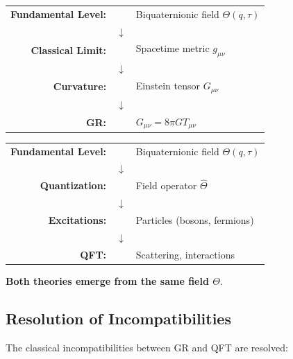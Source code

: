 \documentclass[12pt]{article}
\begin{document}
\begin{center}
\begin{tabular}{rcl}
\textbf{Fundamental Level:} & & Biquaternionic field $\Theta(q,\tau)$ \\
& $\downarrow$ & \\
\textbf{Classical Limit:} & & Spacetime metric $g_{\mu\nu}$ \\
& $\downarrow$ & \\
\textbf{Curvature:} & & Einstein tensor $G_{\mu\nu}$ \\
& $\downarrow$ & \\
\textbf{GR:} & & $G_{\mu\nu} = 8\pi G T_{\mu\nu}$ \\
\end{tabular}
\qquad\qquad
\begin{tabular}{rcl}
\textbf{Fundamental Level:} & & Biquaternionic field $\Theta(q,\tau)$ \\
& $\downarrow$ & \\
\textbf{Quantization:} & & Field operator $\hat{\Theta}$ \\
& $\downarrow$ & \\
\textbf{Excitations:} & & Particles (bosons, fermions) \\
& $\downarrow$ & \\
\textbf{QFT:} & & Scattering, interactions \\
\end{tabular}
\end{center}

\textbf{Both theories emerge from the same field $\Theta$}.

\subsection{Resolution of Incompatibilities}

The classical incompatibilities between GR and QFT are resolved:
\end{document}
